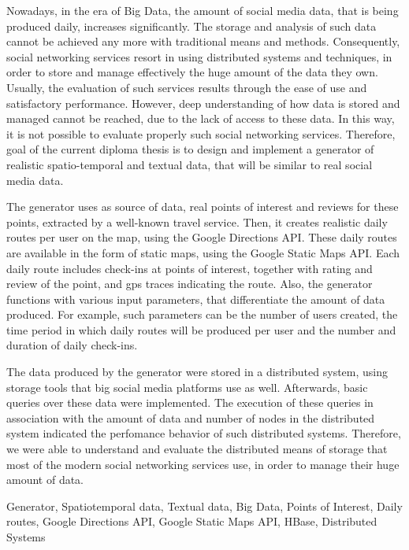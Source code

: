 
\begin{abstracten}%

Nowadays, in the era of Big Data, the amount of social media data, that is being produced daily, increases significantly. The storage and analysis of such data cannot 
be achieved any more with traditional means and methods. Consequently, social networking services resort in using distributed systems and techniques, in order to store 
and manage effectively the huge amount of the data they own. Usually, the evaluation of such services results through the ease of use and satisfactory performance. 
However, deep understanding of how data is stored and managed cannot be reached, due to the lack of access to these data. In this way, it is not possible to 
evaluate properly such social networking services. Therefore, goal of the current diploma thesis is to design and implement a generator of realistic spatio-temporal and 
textual data, that will be similar to real social media data. 

The generator uses as source of data, real points of interest and reviews for these points, extracted by a well-known travel service. Then, it creates 
realistic daily routes per user on the map, using the Google Directions API. These daily routes are available in the form of static maps, using the 
Google Static Maps API. Each daily route includes check-ins at points of interest, together with rating and review of the point, and gps traces 
indicating the route. Also, the generator functions with various input parameters, that differentiate the amount of data produced. For example, such parameters 
can be the number of users created, the time period in which daily routes will be produced per user and the number and duration of daily check-ins. 

The data produced by the generator were stored in a distributed system, using storage tools that big social media platforms use as well. Afterwards, 
basic queries over these data were implemented. The execution of these queries in association with the 
amount of data and number of nodes in the distributed system indicated the perfomance behavior of such distributed systems. Therefore, we were able to 
understand and evaluate the distributed means of storage that most of the modern social networking services use, in order to manage their huge amount of data. 



 \begin{keywordsen}
  Generator, Spatiotemporal data, Textual data, Big Data, Points of Interest, Daily routes, Google Directions API, Google Static Maps API, HBase, Distributed Systems
 \end{keywordsen}
\end{abstracten}

